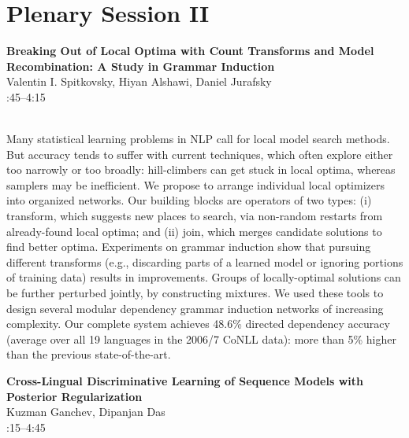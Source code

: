 \documentclass[twoside,makeidx]{book}
\renewcommand{\normalsize}{\fontsize{8}{9}\selectfont}
\renewcommand{\small}{\fontsize{7}{8}\selectfont}
\begin{document}
\section{Plenary Session II}
\vspace{-1em}
\par\vspace{2em}\noindent%
\begin{minipage}{\linewidth}%
\begin{center}
\textbf{\normalsize Breaking Out of Local Optima with Count Transforms and Model Recombination: A Study in Grammar Induction}\\
\normalsize  Valentin I. Spitkovsky,  Hiyan Alshawi,  Daniel Jurafsky\\
{\small 3:45--4:15}\\
\end{center}
\end{minipage}\\[0.5em]
\nopagebreak%
\noindent%
{\small Many statistical learning problems in NLP call for local model search methods. But accuracy tends to suffer with current techniques, which often explore either too narrowly or too broadly: hill-climbers can get stuck in local optima, whereas samplers may be inefficient.  We propose to arrange individual local optimizers into organized networks.  Our building blocks are operators of two types: (i) transform, which suggests new places to search, via non-random restarts from already-found local optima; and (ii) join, which merges candidate solutions to find better optima. Experiments on grammar induction show that pursuing different transforms (e.g., discarding parts of a learned model or ignoring portions of training data) results in improvements. Groups of locally-optimal solutions can be further perturbed jointly, by constructing mixtures. We used these tools to design several modular dependency grammar induction networks of increasing complexity. Our complete system achieves 48.6\% directed dependency accuracy (average over all 19 languages in the 2006/7 CoNLL data): more than 5\% higher than the previous state-of-the-art.}
\par\vspace{2em}\noindent%
\begin{minipage}{\linewidth}%
\begin{center}
\textbf{\normalsize Cross-Lingual Discriminative Learning of Sequence Models with Posterior Regularization}\\
\normalsize  Kuzman Ganchev,  Dipanjan Das\\
{\small 4:15--4:45}\\
\end{center}
\end{minipage}\\[0.5em]
\end{document}

